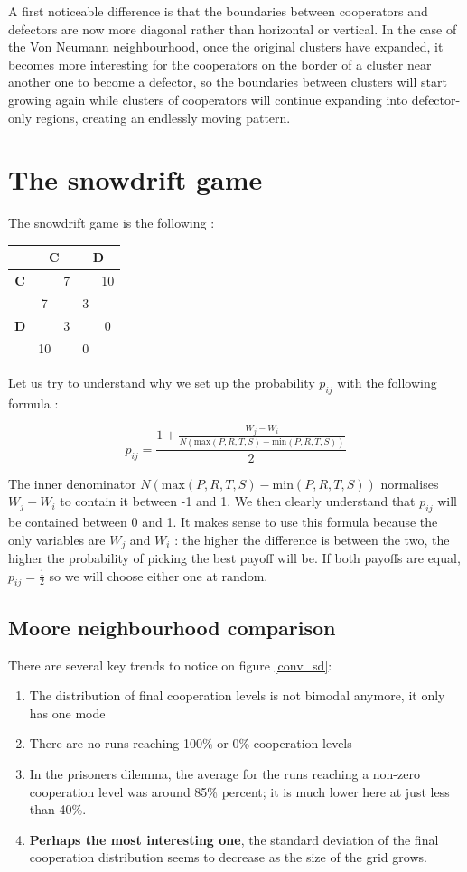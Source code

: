\documentclass[a4paper]{article}
\begin{document}
A first noticeable difference is that the boundaries between cooperators and
defectors are now more diagonal rather than horizontal or vertical. In the 
case of the Von Neumann neighbourhood, once the original clusters have 
expanded, it becomes more interesting for the cooperators on the border of
a cluster near another one to become a defector, so the boundaries between
clusters will start growing again while clusters of cooperators will continue
expanding into defector-only regions, creating an endlessly moving pattern.


\section{The snowdrift game}
The snowdrift game is the following :
\begin{table}[H]
\centering
\begin{tabular}{c|cc|cc}
	& \multicolumn{2}{c|}{\textbf{C}} & \multicolumn{2}{c}{\textbf{D}}\\
	\hline
	\textbf{C} && 7 && 10\\
	& 7 && 3 &\\
	\hline
	\textbf{D} && 3 && 0\\
	& 10 && 0 &\\
\end{tabular}
\end{table}
Let us try to understand why we set up the probability $p_{ij}$ with the
following formula :

$$ p_{ij} = \frac{
	1 + \frac{W_j-W_i}{N(\text{max}(P,R,T,S)-\text{min}(P,R,T,S))}
	}
	{2}$$

The inner denominator $N(\text{max}(P,R,T,S)-\text{min}(P,R,T,S))$
normalises $W_j-W_i$ to contain it between -1 and 1. We then clearly 
understand that $p_{ij}$ will be contained between 0 and 1. It makes sense
to use this formula because the only variables are $W_j$ and $W_i$ : the higher
the difference is between the two, the higher the probability of picking the 
best payoff will be. If both payoffs are equal, $p_{ij} = \frac{1}{2}$ so 
we will choose either one at random.

\subsection{Moore neighbourhood comparison}
There are several key trends to notice on figure \ref{conv_sd}:
\begin{enumerate}
	\item The distribution of final cooperation levels is not bimodal
		anymore, it only has one mode
	\item There are no runs reaching 100\% or 0\% cooperation levels
	\item In the prisoners dilemma, the average for the runs reaching a
		non-zero cooperation level was around 85\% percent; it is 
		much lower here at just less than 40\%.
	\item \textbf{Perhaps the most interesting one}, the standard 
		deviation of the final cooperation distribution seems to
		decrease as the size of the grid grows.
\end{enumerate}
\end{document}
